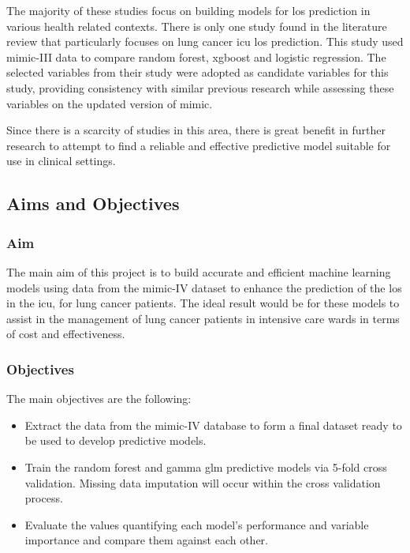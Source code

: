 \documentclass[11pt]{article}
\begin{document}
The majority of these studies focus on building models for \gls{los} prediction in various health related contexts. There is only one study found in the literature review that particularly focuses on lung cancer \gls{icu} \gls{los} prediction\cite{Alsinglawi123}. This study used \gls{mimic}-III data to compare random forest, \gls{xgboost} and logistic regression. The selected variables from their study were adopted as candidate variables for this study, providing consistency with similar previous research while assessing these variables on the updated version of \gls{mimic}.   

Since there is a scarcity of studies in this area, there is great benefit in further research to attempt to find a reliable and effective predictive model suitable for use in clinical settings.

\subsection{Aims and Objectives}

\subsubsection{Aim}

The main aim of this project is to build accurate and efficient machine learning models using data from the \gls{mimic}-IV dataset to enhance the prediction of the \gls{los} in the \gls{icu}, for lung cancer patients. The ideal result would be for these models to assist in the management of lung cancer patients in intensive care wards in terms of cost and effectiveness.

\subsubsection{Objectives}

The main objectives are the following:
\begin{itemize}
    \item Extract the data from the \gls{mimic}-IV database to form a final dataset ready to be used to develop predictive models.
    \item Train the random forest and gamma \gls{glm} predictive models via 5-fold cross validation. Missing data imputation will occur within the cross validation process.
    \item Evaluate the values quantifying each model's performance and variable importance and compare them against each other.
\end{itemize}
\end{document}

